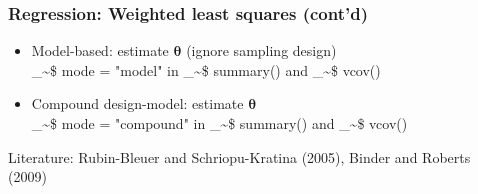 \documentclass[framenumber,t]{beamer}
\makeatletter
\newcommand\code{\bgroup\@makeother\_\@makeother\~\@makeother\$\@makeother\^\@codex}
\def\@codex#1{{\normalfont\ttfamily\hyphenchar\font=-1 #1}\egroup}
\makeatother
\begin{document}
\begin{frame}[fragile]
    \frametitle{Regression: Weighted least squares {\small (cont'd)}}
    \begin{itemize}
        \setlength\itemsep{1em}
        \item \alert{Model-based}: estimate $\bm \theta$ (ignore sampling
            design)\\
            \vspace{0.5em}
            \code{mode = "model"} in \code{summary()} and \code{vcov()}
        \item \alert{Compound design-model}: estimate $\bm \theta$\\
            \vspace{0.5em}
            \code{mode = "compound"} in \code{summary()} and \code{vcov()}
            \vspace{0.5em}
    \end{itemize}
    \vspace{1em}
    {\small Literature: Rubin-Bleuer and Schriopu-Kratina (2005), Binder
        and Roberts (2009)}
 \end{frame}
\end{document}
